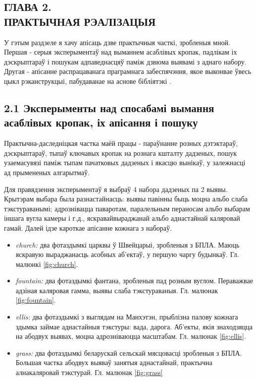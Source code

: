 \begin{center}
    \section*{ГЛАВА 2. \\ ПРАКТЫЧНАЯ РЭАЛІЗАЦЫЯ}
\end{center}

\renewcommand{\floatpagefraction}{.8}%

У гэтым раздзеле я хачу апісаць дзве практычныя часткі, зробленыя мной.
Першая - серыя эксперыментаў над выманнем асаблівых кропак, падлікам іх дэскрыптараў і
пошукам адпаведнасцяў паміж дзвюма выявамі з аднаго набору.
Другая - апісанне распрацаванага праграмнага забеспячэння, якое выконвае ўвесь цыкл рэканструкцыі,
пабудаванае на аснове бібліятэкі \cite{theia-sfm}.

\vspace{5mm}

\subsection*{2.1 Эксперыменты над спосабамі вымання асаблівых кропак, іх апісання і пошуку}

Практычна-даследніцкая частка маёй працы - параўнанне розных дэтэктараў, дэскрыптараў, тыпаў ключавых кропак
на рознага кшталту дадзеных, пошук узаемасувязі паміж тыпам пачатковых дадзеных і якасцю вынікаў, у залежнасці
ад прымененых алгарытмаў.

\vspace{5mm}

Для правядзення эксперыментаў я выбраў 4 набора дадзеных па 2 выявы. Крытэрам выбара была разнастайнасць: выявы павінны быць моцна альбо
слаба тэкстураванымі; адрознівацца паваротам, паралельным пераносам альбо выбарам іншага вугла камеры і г.д., яскравайвыраджанай
альбо аднастайнай каляровай гамай. Далей ідзе кароткае апісанне кожнага з набораў.

\begin{itemize}
    \item \textit{church:} два фотаздымкі царквы ў Швейцарыі, зробленыя з БПЛА.
    Маюць яскравую выраджанасць асобных аб'ектаў, у першую чаргу будынкаў. Гл. малюнкі \ref{fig:church}.
    \item \textit{fountain:} два фотаздымкі фантана, зробленыя пад розным вуглом.
    Пераважвае адзіная каляровая гамма, выявы слаба тэкстураваныя. Гл. малюнак \ref{fig:fountain}.
    \item \textit{ellis:} два фотаздымкі з выглядам на Манхэтэн, прыблізна палову
    кожнага здымка займае аднастайныя тэкстуры: вада, дарога. Аб'екты, якія знаходзяцца
    на абодвух выявах, моцна адрозніваюцца масштабам. Гл. малюнак \ref{fig:ellis}.
    \item \textit{grass:} два фотаздымкі беларускай сельскай мясцовасці зробленыя з БПЛА.
    Большая частка абодвух выяваў занятыя аднастайнай, практычна алнакаляровай тэкстурай. Гл. малюнак \ref{fig:grass}
\end{itemize}

